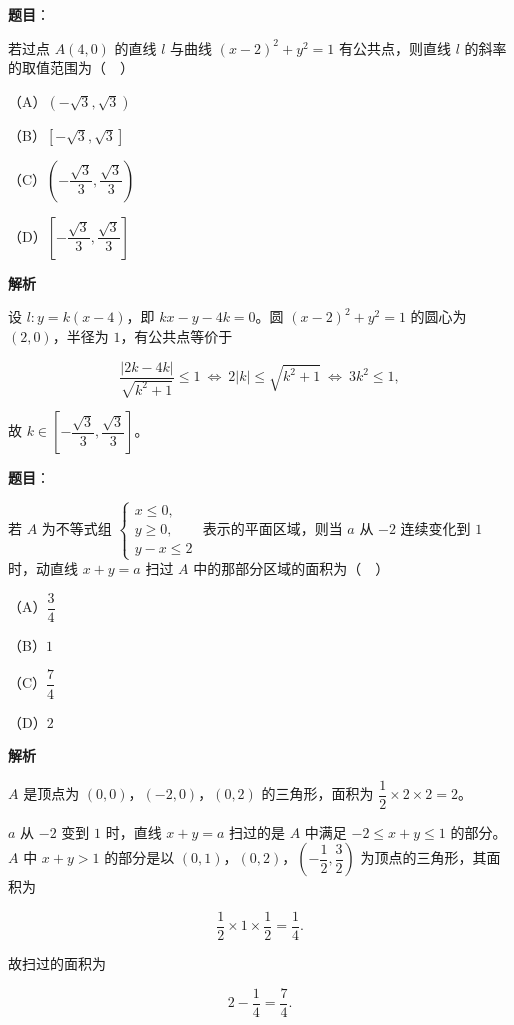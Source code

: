 \begin{answer}

\textbf{题目}：

若过点 $A(4,0)$ 的直线 $l$ 与曲线 $(x-2)^2+y^2=1$ 有公共点，则直线 $l$ 的斜率的取值范围为（　）

（A）$(-\sqrt3,\sqrt3)$

（B）$[-\sqrt3,\sqrt3]$

（C）$\left(-\dfrac{\sqrt3}{3},\dfrac{\sqrt3}{3}\right)$

（D）$\left[-\dfrac{\sqrt3}{3},\dfrac{\sqrt3}{3}\right]$

\textbf{解析}

设 $l:y=k(x-4)$，即 $kx-y-4k=0$。圆 $(x-2)^2+y^2=1$ 的圆心为 $(2,0)$，半径为 $1$，有公共点等价于

\nopagebreak[4]
\[\frac{|2k-4k|}{\sqrt{k^2+1}}\leqslant1\ \Longleftrightarrow\ 2|k|\leqslant\sqrt{k^2+1}\ \Longleftrightarrow\ 3k^2\leqslant1,\]

故 $k\in\left[-\dfrac{\sqrt3}3,\dfrac{\sqrt3}3\right]$。


\end{answer}
\begin{answer}

\textbf{题目}：

若 $A$ 为不等式组 $\begin{cases}x\leqslant0,\\ y\geqslant0,\\ y-x\leqslant2\end{cases}$ 表示的平面区域，则当 $a$ 从 $-2$ 连续变化到 $1$ 时，动直线 $x+y=a$ 扫过 $A$ 中的那部分区域的面积为（　）

（A）$\dfrac34$

（B）$1$

（C）$\dfrac74$

（D）$2$

\textbf{解析}

$A$ 是顶点为 $(0,0)$，$(-2,0)$，$(0,2)$ 的三角形，面积为 $\dfrac12\times2\times2=2$。

$a$ 从 $-2$ 变到 $1$ 时，直线 $x+y=a$ 扫过的是 $A$ 中满足 $-2\leqslant x+y\leqslant1$ 的部分。$A$ 中 $x+y>1$ 的部分是以 $(0,1)$，$(0,2)$，$\left(-\dfrac12,\dfrac32\right)$ 为顶点的三角形，其面积为

\nopagebreak[4]
\[\frac12\times1\times\frac12=\frac14.\]

故扫过的面积为

\nopagebreak[4]
\[2-\frac14=\frac74.\]


\end{answer}
